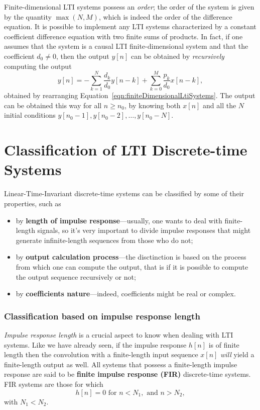 \documentclass[\documentfontsize, twocolumn]{\classname}
\begin{document}
Finite-dimensional LTI systems possess an \emph{order}; the order of the system is given by the quantity $\max {(N,M)}$, which is indeed the order of the difference equation. It is possible to implement any LTI systems characterized by a constant coefficient difference equation with two finite sums of products. In fact, if one assumes that the system is a causal LTI finite-dimensional system and that the coefficient $d_0 \neq 0$, then the output $y[n]$ can be obtained by \emph{recursively} computing the output
\begin{equation}\label{eqn:finiteDimensionalLtiSystemsRecursive}
    y[n]= -\sum_{k=1}^N \frac {d_k}{d_0} y[n-k] + \sum_{k=0}^M \frac{p_k}{d_0} x[n-k],
\end{equation}
obtained by rearranging Equation~\ref{eqn:finiteDimensionalLtiSystems}. The output can be obtained this way for all $n \geq n_0$, by knowing both $x[n]$ and all the $N$ initial conditions $y[n_0-1], y[n_0-2],\dots,y[n_0-N]$.

\section{Classification of LTI Discrete-time Systems}

Linear-Time-Invariant discrete-time systems can be classified by some of their properties, such as
\begin{itemize}
    \item by \textbf{length of impulse response}---usually, one wants to deal with finite-length signals, so it's very important to divide impulse responses that might generate infinite-length sequences from those who do not;
    \item by \textbf{output calculation process}---the disctinction is based on the process from which one can compute the output, that is if it is possible to compute the output sequence recursively or not;
    \item by \textbf{coefficients nature}---indeed, coefficients might be real or complex.
\end{itemize}

\subsubsection{Classification based on impulse response length}
\emph{Impulse response length} is a crucial aspect to know when dealing with LTI systems. Like we have already seen, if the impulse response $h[n]$ is of finite length then the convolution with a finite-length input sequence $x[n]$ \emph{will} yield a finite-length output as well. All systems that possess a finite-length impulse response are said to be \textbf{finite impulse response (FIR)} discrete-time systems. FIR systems are those for which
\[
    h[n] = 0 \mbox{ for } n < N_1, \mbox{ and } n > N_2,
\]
with $N_1 < N_2$.
\end{document}
